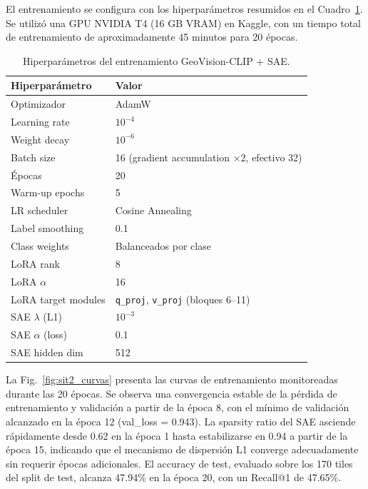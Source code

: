 \documentclass[10pt,a4paper,twocolumn]{article}
\begin{document}
El entrenamiento se configura con los hiperparámetros resumidos en el Cuadro~\ref{tab:hp_sit2}. Se utilizó una GPU NVIDIA T4 (16 GB VRAM) en Kaggle, con un tiempo total de entrenamiento de aproximadamente 45 minutos para 20 épocas.

\begin{table}[H]
  \centering
  \small
  \begin{tabular}{ll}
    \toprule
    \textbf{Hiperparámetro} & \textbf{Valor} \\
    \midrule
    Optimizador            & AdamW \\
    Learning rate          & $10^{-4}$ \\
    Weight decay           & $10^{-6}$ \\
    Batch size             & 16 (gradient accumulation $\times$2, efectivo 32) \\
    Épocas                 & 20 \\
    Warm-up epochs         & 5 \\
    LR scheduler           & Cosine Annealing \\
    Label smoothing        & 0.1 \\
    Class weights          & Balanceados por clase \\
    \midrule
    LoRA rank              & 8 \\
    LoRA $\alpha$          & 16 \\
    LoRA target modules    & \texttt{q\_proj}, \texttt{v\_proj} (bloques 6--11) \\
    \midrule
    SAE $\lambda$ (L1)     & $10^{-3}$ \\
    SAE $\alpha$ (loss)    & 0.1 \\
    SAE hidden dim         & 512 \\
    \bottomrule
  \end{tabular}
  \caption{Hiperparámetros del entrenamiento GeoVision-CLIP + SAE.}
  \label{tab:hp_sit2}
\end{table}

La Fig.~\ref{fig:sit2_curvas} presenta las curvas de entrenamiento monitoreadas durante las 20 épocas. Se observa una convergencia estable de la pérdida de entrenamiento y validación a partir de la época 8, con el mínimo de validación alcanzado en la época 12 (val\_loss = 0.943). La sparsity ratio del SAE asciende rápidamente desde 0.62 en la época 1 hasta estabilizarse en 0.94 a partir de la época 15, indicando que el mecanismo de dispersión L1 converge adecuadamente sin requerir épocas adicionales. El accuracy de test, evaluado sobre los 170 tiles del split de test, alcanza 47.94\% en la época 20, con un Recall@1 de 47.65\%.
\end{document}
